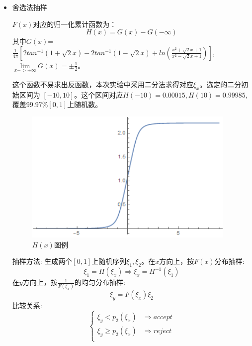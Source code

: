 \documentclass[UTF8]{ctexart}
\begin{document}
	\begin{itemize}
		\item 舍选法抽样
		
	$F(x)$对应的归一化累计函数为：$$H(x)=G(x)-G(-\infty)$$其中$G(x)$=$\frac{1}{4\pi}[2tan^{-1}(1+\sqrt{2}x)-2tan^{-1}(1-\sqrt{2}x)+ln(\frac{x^2+\sqrt{2}x+1}{x^2-\sqrt{2}x+1})]$,$\lim\limits_{x->\pm\infty}G(x)=\pm\frac{1}{2}$。
	
	\quad 这个函数不易求出反函数，本次实验中采用二分法求得对应$\xi_x$。选定的二分初始区间为
	$[-10,10]$。这个区间对应$H(-10)=0.00015,H(10)=0.99985$,覆盖$99.97\%[0,1]$上随机数。
	
	\begin{figure}[H]
		\centering\includegraphics[width=4in]{../figure/F.png}
		\caption{$H(x)$图例}
	\end{figure}
	
	抽样方法:
	生成两个$[0,1]$上随机序列$\xi_1,\xi_2$。在$x$方向上，按$F(x)$分布抽样:$$\xi_1=H(\xi_x)\Rightarrow\xi_x=H^{-1}(\xi_1)$$
	在$y$方向上，按$\frac{1}{F(\xi_x)}$的均匀分布抽样:$$\xi_y=F(\xi_x)\xi_2$$
	比较关系:
	$$\left\{
	\begin{array}{lc}
	\xi_y<p_2(\xi_x)& \Rightarrow accept\\
	\xi_y\geq p_2(\xi_x)& \Rightarrow reject\\
	\end{array}
	\right.
	$$
		
		
		
	
	\end{itemize}
	
\end{document}
